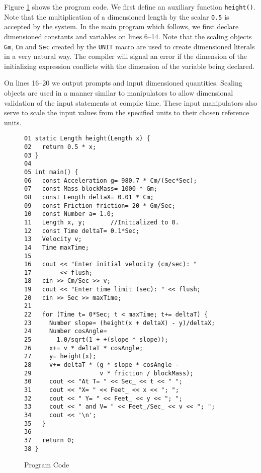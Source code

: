 Figure \ref{Fig:Code} shows the program code.  We first define an
auxiliary function {\tt height()}.  Note that the multiplication
of a dimensioned length by the scalar {\tt 0.5} is accepted by the
system.  In the main program which follows, we first declare
dimensioned constants and variables on lines 6--14.  Note that the
scaling objects {\tt Gm}, {\tt Cm} and {\tt Sec} created by the
{\tt UNIT} macro are used to create dimensioned literals in a very
natural way.  The compiler will signal an error if the dimension
of the initializing expression conflicts with the dimension of the
variable being declared.

On lines 16--20 we output prompts and input dimensioned
quantities.  Scaling objects are used in a manner similar to
manipulators \cite{stroustrup:91} to allow dimensional validation
of the input statements at compile time.  These input manipulators
also serve to scale the input values from the specified units to
their chosen reference units.

\begin{figure}

{\footnotesize
\begin{verbatim}
01 static Length height(Length x) {
02   return 0.5 * x;
03 }
04 
05 int main() {
06   const Acceleration g= 980.7 * Cm/(Sec*Sec);
07   const Mass blockMass= 1000 * Gm;
08   const Length deltaX= 0.01 * Cm;
09   const Friction friction= 20 * Gm/Sec;
10   const Number a= 1.0;
11   Length x, y;       //Initialized to 0.
12   const Time deltaT= 0.1*Sec;
13   Velocity v;
14   Time maxTime;
15 
16   cout << "Enter initial velocity (cm/sec): " 
17        << flush;
18   cin >> Cm/Sec >> v;
19   cout << "Enter time limit (sec): " << flush;
20   cin >> Sec >> maxTime;
21 
22   for (Time t= 0*Sec; t < maxTime; t+= deltaT) {
23     Number slope= (height(x + deltaX) - y)/deltaX;
24     Number cosAngle= 
25       1.0/sqrt(1 + +(slope * slope));
26     x+= v * deltaT * cosAngle;
27     y= height(x);
28     v+= deltaT * (g * slope * cosAngle - 
29                   v * friction / blockMass);
30     cout << "At T= " << Sec_ << t << " ";
31     cout << "X= " << Feet_ << x << "; ";
32     cout << " Y= " << Feet_ << y << "; ";
33     cout << " and V= " << Feet_/Sec_ << v << "; ";
34     cout << '\n';
35   }
36 
37   return 0;
38 }
\end{verbatim}
}

\caption{Program Code}
\label{Fig:Code}
\end{figure}

